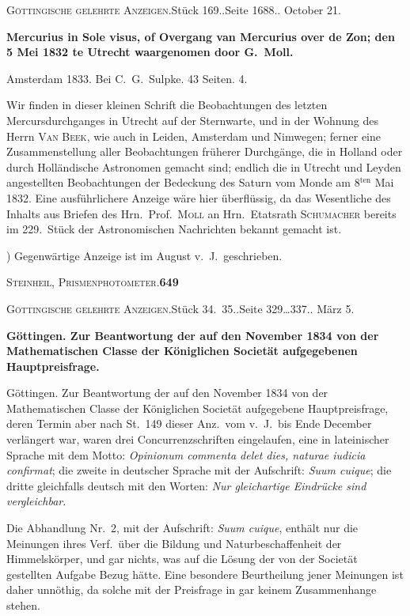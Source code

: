 \documentclass[12pt,a4paper]{article}
\newcommand{\anzeigeheading}[4]{%
    \begin{center}
    \small\textsc{G\"ottingische gelehrte Anzeigen.}\quad St\"uck #1.\quad Seite #2.\quad #3
    \end{center}
    \vspace{-2mm}
    \begin{center}\small\textbf{#4}\end{center}
    \vspace{2mm}
}
\begin{document}
\anzeigeheading{169.}{1688.}{1833 October 21.}{Mercurius in Sole visus, of Overgang van Mercurius over de Zon; den 5 Mei 1832 te Utrecht waargenomen door G.\ Moll.}

\noindent\small Amsterdam 1833. Bei C.\ G.\ Sulpke. 43 Seiten. 4.

\vspace{2mm}

Wir finden in dieser kleinen Schrift die Beobachtungen des letzten Mercursdurchganges in Utrecht auf der Sternwarte, und in der Wohnung des Herrn \textsc{Van Beek}, wie auch in Leiden, Amsterdam und Nimwegen; ferner eine Zusammenstellung aller Beobachtungen fr\"uherer Durchg\"ange, die in Holland oder durch Holl\"andische Astronomen gemacht sind; endlich die in Utrecht und Leyden angestellten Beobachtungen der Bedeckung des Saturn vom Monde am 8$^{\text{ten}}$ Mai 1832. Eine ausf\"uhrlichere Anzeige w\"are hier \"uberfl\"ussig, da das Wesentliche des Inhalts aus Briefen des Hrn.\ Prof.\ \textsc{Moll} an Hrn.\ Etatsrath \textsc{Schumacher} bereits im 229.\ St\"uck der Astronomischen Nachrichten bekannt gemacht ist.

\vspace{3mm}
{\small *) Gegenw\"artige Anzeige ist im August v.\ J.\ geschrieben.}

\newpage

\begin{center}
\small\textsc{Steinheil, Prismenphotometer.}\quad\textbf{649}
\end{center}

\anzeigeheading{34.\ 35.}{329\dots 337.}{1835 M\"arz 5.}{G\"ottingen. Zur Beantwortung der auf den November 1834 von der Mathematischen Classe der K\"oniglichen Societ\"at aufgegebenen Hauptpreisfrage.}

G\"ottingen. Zur Beantwortung der auf den November 1834 von der Mathematischen Classe der K\"oniglichen Societ\"at aufgegebene Hauptpreisfrage, deren Termin aber nach St.\ 149 dieser Anz.\ vom v.\ J.\ bis Ende December verl\"angert war, waren drei Concurrenzschriften eingelaufen, eine in lateinischer Sprache mit dem Motto: \textit{Opinionum commenta delet dies, naturae iudicia confirmat}; die zweite in deutscher Sprache mit der Aufschrift: \textit{Suum cuique}; die dritte gleichfalls deutsch mit den Worten: \textit{Nur gleichartige Eindr\"ucke sind vergleichbar}.

Die Abhandlung Nr.\ 2, mit der Aufschrift: \textit{Suum cuique}, enth\"alt nur die Meinungen ihres Verf.\ \"uber die Bildung und Naturbeschaffenheit der Himmelsk\"orper, und gar nichts, was auf die L\"osung der von der Societ\"at gestellten Aufgabe Bezug h\"atte. Eine besondere Beurtheilung jener Meinungen ist daher unn\"othig, da solche mit der Preisfrage in gar keinem Zusammenhange stehen.
\end{document}
